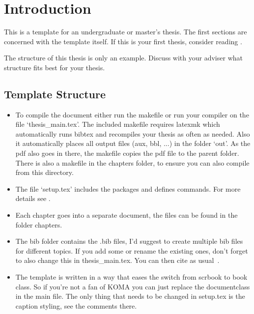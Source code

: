 \chapter{Introduction}\label{chap:introduction}
This is a template for an undergraduate or master's thesis.
The first sections are concerned with the template itself. If this is your first
thesis, consider reading .

The structure of this thesis is only an example.
Discuss with your adviser what structure fits best for your thesis.

\section{Template Structure}
\begin{itemize}
    \item To compile the document either run the makefile or run your compiler on the file `thesis\_main.tex'. The included makefile requires latexmk which automatically runs bibtex and recompiles your thesis as often as needed. Also it automatically places all output files (aux, bbl, ...) in the folder `out'. As the pdf also goes in there, the makefile copies the pdf file to the parent folder. There is also a makefile in the chapters folder, to ensure you can also compile from this directory.

    \item The file `setup.tex' includes the packages and defines commands. For more details see .

    \item Each chapter goes into a separate document, the files can be found in the folder chapters.

    \item The bib folder contains the .bib files, I'd suggest to create multiple bib files for different topics. If you add some or rename the existing ones, don't forget to also change this in thesis\_main.tex. You can then cite as usual~\cite{kingma2014adam, bromley1993siamesesignature,muja2009flann}.

    \item The template is written in a way that eases the switch from scrbook to book class. So if you're not a fan of KOMA you can just replace the documentclass in the main file. The only thing that needs to be changed in setup.tex is the caption styling, see the comments there.
\end{itemize}


